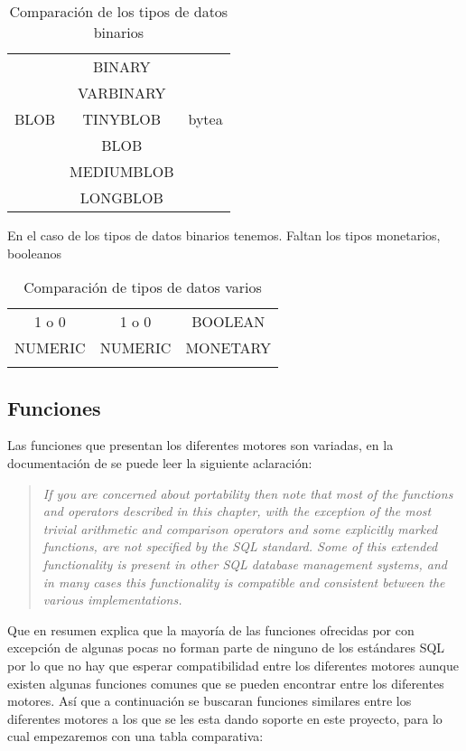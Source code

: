 \begin{table}[h]
\begin{center}
\begin{tabular}{|c|c|c|}
\hline \s & \m & \p \\ 
\hline  & BINARY &  \\  
 & VARBINARY &  \\ 
 BLOB & TINYBLOB & bytea \\ 
 & BLOB &  \\ 
 & MEDIUMBLOB &  \\
& LONGBLOB &  \\ 
\hline 
\end{tabular} 
\end{center}
\caption{Comparación de los tipos de datos binarios}
\end{table}

En el caso de los tipos de datos binarios tenemos.
Faltan los tipos monetarios, booleanos

\begin{table}[h]
\begin{center}
\begin{tabular}{|c|c|c|}
\hline \s & \m & \p \\ 
\hline 1 o 0 & 1 o 0 & BOOLEAN \\  
\hline NUMERIC & NUMERIC & MONETARY \\  
&  &  \\  
\hline 
\end{tabular} 
\end{center}
\caption{Comparación de tipos de datos varios}
\end{table}

\subsection{Funciones}
\label{especificacion:funciones} 
Las funciones que presentan los diferentes motores son variadas, en la documentación de  \p se puede leer\citep{postgre:functions} la siguiente aclaración:
\begin{quotation}
\textit{If you are concerned about portability then note that most of the functions and operators described in this chapter, with the exception of the most trivial arithmetic and comparison operators and some explicitly marked functions, are not specified by the SQL standard. Some of this extended functionality is present in other SQL database management systems, and in many cases this functionality is compatible and consistent between the various implementations.}
\end{quotation}
Que en resumen explica que la mayoría de las funciones ofrecidas por \p con excepción de algunas pocas no forman parte de ninguno de los estándares SQL por lo que no hay que esperar compatibilidad entre los diferentes motores aunque existen algunas funciones comunes que se pueden encontrar entre los diferentes motores. Así que a continuación se buscaran funciones similares entre los diferentes motores a los que se les esta dando soporte en este proyecto, para lo cual empezaremos con una tabla comparativa:

